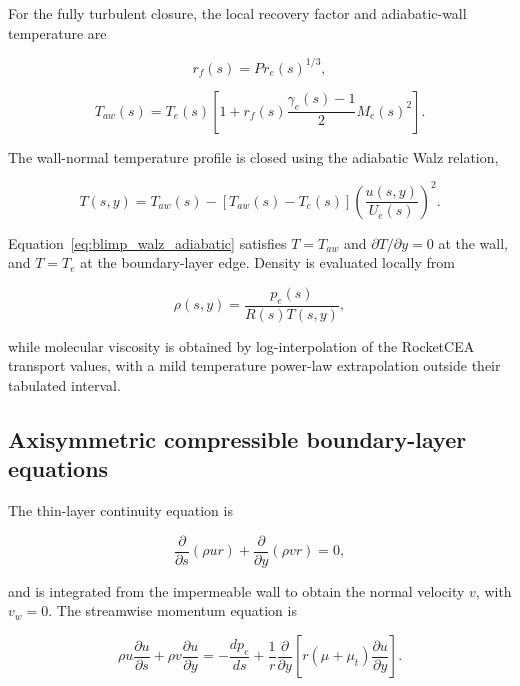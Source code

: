 For the fully turbulent closure, the local recovery factor and adiabatic-wall
temperature are

\begin{equation}
r_f(s)=Pr_e(s)^{1/3},
\label{eq:blimp_recovery_factor}
\end{equation}

\begin{equation}
\boxed{
T_{aw}(s)=T_e(s)
\left[
1+r_f(s)\frac{\gamma_e(s)-1}{2}M_e(s)^2
\right]
}.
\label{eq:blimp_recovery_temperature}
\end{equation}

The wall-normal temperature profile is closed using the adiabatic Walz relation,

\begin{equation}
\boxed{
T(s,y)=T_{aw}(s)-\left[T_{aw}(s)-T_e(s)\right]
\left(\frac{u(s,y)}{U_e(s)}\right)^2
}.
\label{eq:blimp_walz_adiabatic}
\end{equation}

Equation~\eqref{eq:blimp_walz_adiabatic} satisfies \(T=T_{aw}\) and
\(\partial T/\partial y=0\) at the wall, and \(T=T_e\) at the boundary-layer
edge. Density is evaluated locally from

\begin{equation}
\rho(s,y)=\frac{p_e(s)}{R(s)T(s,y)},
\label{eq:blimp_density}
\end{equation}

while molecular viscosity is obtained by log-interpolation of the RocketCEA
transport values, with a mild temperature power-law extrapolation outside their
tabulated interval.

\subsection{Axisymmetric compressible boundary-layer equations}

The thin-layer continuity equation is

\begin{equation}
\boxed{
\frac{\partial}{\partial s}\!\left(\rho u r\right)
+
\frac{\partial}{\partial y}\!\left(\rho v r\right)=0
},
\label{eq:blimp_continuity}
\end{equation}

and is integrated from the impermeable wall to obtain the normal velocity \(v\),
with \(v_w=0\). The streamwise momentum equation is

\begin{equation}
\boxed{
\rho u\frac{\partial u}{\partial s}
+\rho v\frac{\partial u}{\partial y}
=-\frac{dp_e}{ds}
+\frac{1}{r}\frac{\partial}{\partial y}
\left[
r\left(\mu+\mu_t\right)\frac{\partial u}{\partial y}
\right]
}.
\label{eq:blimp_momentum}
\end{equation}

